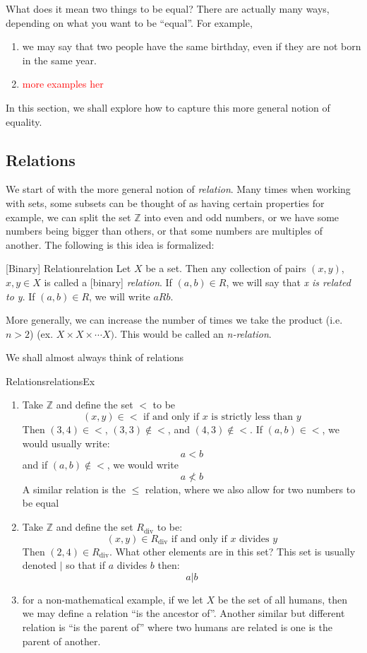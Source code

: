 \documentclass{book}
\newcommand{\Z}{{\mathbb{Z}}}
\newcommand{\qn}{\quad\newline}
\begin{document}
What does it mean two things to be equal?  There
are actually many ways, depending on what you want to be ``equal''. For example,
\begin{enumerate}
	\item we may say that two people have the same birthday, even if they are not born in the same year.
	\item \textcolor{red}{more examples her}
\end{enumerate}

In this section, we shall explore how to capture this more general notion of equality.

\subsection*{Relations}

We start of with the more general notion of \emph{relation}.  Many times when working with sets, some subsets
can be thought of as having certain properties for example, we can split the set $\Z$ into even and odd
numbers, or we have some numbers being bigger than others, or that some numbers are multiples of another. The
following is this idea is formalized:

\begin{defn}{[Binary] Relation}{relation}
	Let $X$ be a set. Then any collection of pairs $(x,y)$, $x,y \in X$ is called a [binary] \emph{relation}. If $(a,b) \in R$, we will
	say that \emph{x is related to y}. If $(a,b) \in R$, we will write $aRb$.

	\qn
	More generally, we can increase the number of times we take the product (i.e. $n > 2$)
	(ex. $X \times X \times \cdots X)$. This would be called an \emph{n-relation}.
\end{defn}

We shall almost always think of relations

\begin{example}{Relations}{relationsEx}
	\begin{enumerate}
		\item Take $\Z$ and define the set $<$ to be
			\[
				(x,y) \in < \text{ if and only if $x$ is strictly less than $y$}
			\]
			Then $(3,4) \in <$, $(3,3) \notin <$, and $(4,3) \notin <$. If $(a,b) \in <$, we would usually
			write:
			\[
				a < b
			\]
			and if $(a,b) \notin <$, we would write
			\[
				a \not< b
			\]
			A similar relation is the $\le$ relation, where we also allow for two numbers to be equal
		\item Take $\Z$ and define the set $R_{\text{div}}$ to be:
			\[
				(x,y) \in R_{\text{div}} \text{ if and only if $x$ divides $y$}
			\]
			Then $(2,4) \in R_{\text{div}}$. What other elements are in this set? This set is usually denoted
			$|$ so that if $a$ divides $b$ then:
			\[
				a | b
			\]
		\item for a non-mathematical example, if we let $X$ be the set of all humans, then we may define
			a relation ``is the ancestor of''. Another similar but different relation is ``is the parent of''
			where two humans are related is one is the parent of another.
	\end{enumerate}
\end{example}
\end{document}
